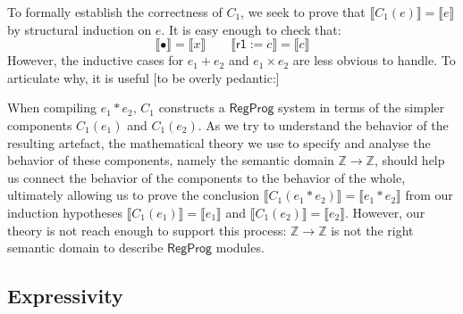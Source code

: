 \documentclass[sigplan,10pt,review,anonymous]{acmart}
\newcommand{\kw}[1]{\ensuremath{ \textsf{#1} }}
\begin{document}
To formally establish the correctness of $C_1$,
we seek to prove that
$\llbracket C_1(e) \rrbracket = \llbracket e \rrbracket$
by structural induction on $e$.
It is easy enough to check that:
\[
  \llbracket \bullet \rrbracket = \llbracket x \rrbracket \qquad
  \llbracket \kw{r1} := c \rrbracket = \llbracket c \rrbracket
\]
However,
the inductive cases for $e_1 + e_2$ and $e_1 \times e_2$
are less obvious to handle.
To articulate why,
it is useful [to be overly pedantic:]

When compiling $e_1 * e_2$,
$C_1$ constructs a $\kw{RegProg}$ system
in terms of the simpler components $C_1(e_1)$ and $C_1(e_2)$.
As we try to understand the behavior of the resulting artefact,
the mathematical theory we use to specify and analyse
the behavior of these components,
namely the semantic domain $\mathbb{Z} \rightarrow \mathbb{Z}$,
should help us connect
the behavior of the components to
the behavior of the whole,
ultimately allowing us to prove
the conclusion $\llbracket C_1(e_1 * e_2) \rrbracket = \llbracket e_1 * e_2 \rrbracket$
from our induction hypotheses
$\llbracket C_1(e_1) \rrbracket = \llbracket e_1 \rrbracket$ and
$\llbracket C_1(e_2) \rrbracket = \llbracket e_2 \rrbracket$.
However,
our theory is not reach enough to support this process:
$\mathbb{Z} \rightarrow \mathbb{Z}$
is not the right semantic domain
to describe $\kw{RegProg}$ modules.



\subsection{Expressivity} %
\end{document}
